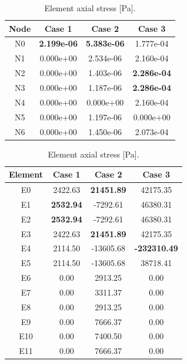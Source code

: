 \documentclass{article}
\begin{document}
\begin{table}[!t]
\centering
\caption{Problem 1 displacements and stresses.}
\label{tab:p1_results}
\scriptsize
\setlength{\tabcolsep}{3.0pt}
\renewcommand{\arraystretch}{0.88}
\begin{subtable}[t]{\columnwidth}
\centering
\caption{Nodal deflection magnitude, $|u|$ [ft].}
\begin{tabular}{c c c c}
\toprule
Node & Case 1 & Case 2 & Case 3 \\
\midrule
N0 & \textbf{2.199e-06} & \textbf{5.383e-06} & 1.777e-04 \\
N1 & 0.000e+00 & 2.534e-06 & 2.160e-04 \\
N2 & 0.000e+00 & 1.403e-06 & \textbf{2.286e-04} \\
N3 & 0.000e+00 & 1.187e-06 & \textbf{2.286e-04} \\
N4 & 0.000e+00 & 0.000e+00 & 2.160e-04 \\
N5 & 0.000e+00 & 1.197e-06 & 0.000e+00 \\
N6 & 0.000e+00 & 1.450e-06 & 2.073e-04 \\
\bottomrule
\end{tabular}
\label{tab:p1_node_u}
\end{subtable}
\vspace{2pt}
\begin{subtable}[t]{\columnwidth}
\centering
\caption{Element axial stress [Pa].}
\begin{tabular}{c c c c}
\toprule
Element & Case 1 & Case 2 & Case 3 \\
\midrule
E0  &  2422.63 & \textbf{21451.89} &  42175.35 \\
E1  & \textbf{2532.94} &  -7292.61 &  46380.31 \\
E2  & \textbf{2532.94} &  -7292.61 &  46380.31 \\
E3  &  2422.63 & \textbf{21451.89} &  42175.35 \\
E4  &  2114.50 & -13605.68 & \textbf{-232310.49} \\
E5  &  2114.50 & -13605.68 &  38718.41 \\
E6  &  0.00 &  2913.25 & 0.00 \\
E7  &  0.00 &  3311.37 & 0.00 \\
E8  &  0.00 &  2913.25 & 0.00 \\
E9  &  0.00 &  7666.37 & 0.00 \\
E10 &  0.00 &  7400.50 & 0.00 \\
E11 &  0.00 &  7666.37 & 0.00 \\
\bottomrule
\end{tabular}
\label{tab:p1_elem_s}
\end{subtable}
\renewcommand{\arraystretch}{1.0}
\end{table}
\end{document}
